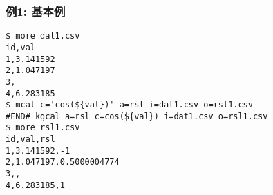 \subsubsection*{例1: 基本例}



\begin{Verbatim}[baselinestretch=0.7,frame=single]
$ more dat1.csv
id,val
1,3.141592
2,1.047197
3,
4,6.283185
$ mcal c='cos(${val})' a=rsl i=dat1.csv o=rsl1.csv
#END# kgcal a=rsl c=cos(${val}) i=dat1.csv o=rsl1.csv
$ more rsl1.csv
id,val,rsl
1,3.141592,-1
2,1.047197,0.5000004774
3,,
4,6.283185,1
\end{Verbatim}
